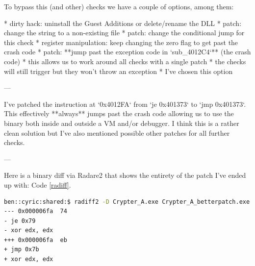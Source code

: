 \begin{markdown}

\clearpage
To bypass this (and other) checks we have a couple of options, among them:\s

* dirty hack: uninstall the Guest Additions or delete/rename the DLL 
* patch: change the string to a non-existing file
* patch: change the conditional jump for this check
* register manipulation: keep changing the zero flag to get past the crash code
* patch: **jump past the exception code in `sub_4012C4`** (the crash code)
    * this allows us to work around all checks with a single patch
    * the checks will still trigger but they won't throw an exception
    * I've chosen this option
    
---

\noindent I've patched the instruction at `0x4012FA` from `je 0x401373` to `jmp 0x401373`.
This effectively **always** jumps past the crash code allowing us to use the binary both inside and outside a VM and/or debugger.
\n
I think this is a rather clean solution but I've also mentioned possible other patches for all further checks.

---

\noindent Here is a binary diff via Radare2 that shows the entirety of the patch I've ended up with: Code \ref{radiff}.\n

\end{markdown}
\begin{lstlisting}[language=bash,name={binary diff},label={radiff}]
ben::cyric:shared:$ radiff2 -D Crypter_A.exe Crypter_A_betterpatch.exe
--- 0x000006fa  74
- je 0x79
- xor edx, edx
+++ 0x000006fa  eb
+ jmp 0x7b
+ xor edx, edx
\end{lstlisting}
